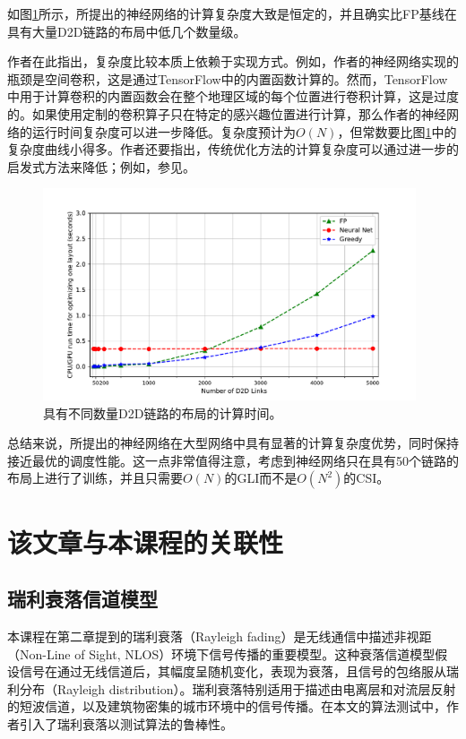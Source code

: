 \documentclass[UTF8, 12pt]{article}
\numberwithin{figure}{section}
\begin{document}
如图\ref{fig:varyDensityTime}所示，所提出的神经网络的计算复杂度大致是恒定的，并且确实比FP基线在具有大量D2D链路的布局中低几个数量级。

作者在此指出，复杂度比较本质上依赖于实现方式。例如，作者的神经网络实现的瓶颈是空间卷积，这是通过TensorFlow中的内置函数计算的\cite{tensorflow}。然而，TensorFlow中用于计算卷积的内置函数会在整个地理区域的每个位置进行卷积计算，这是过度的。如果使用定制的卷积算子只在特定的感兴趣位置进行计算，那么作者的神经网络的运行时间复杂度可以进一步降低。复杂度预计为$O(N)$，但常数要比图\ref{fig:varyDensityTime}中的复杂度曲线小得多。作者还要指出，传统优化方法的计算复杂度可以通过进一步的启发式方法来降低；例如，参见\cite{Guo_1000}。

\begin{figure}
\centering
\includegraphics[width=11cm]{fig/VaryDensityTime}
\caption{具有不同数量D2D链路的布局的计算时间。}
\label{fig:varyDensityTime}
\end{figure}

总结来说，所提出的神经网络在大型网络中具有显著的计算复杂度优势，同时保持接近最优的调度性能。这一点非常值得注意，考虑到神经网络只在具有50个链路的布局上进行了训练，并且只需要$O(N)$的GLI而不是$O(N^2)$的CSI。

\clearpage

\section{该文章与本课程的关联性}

\subsection{瑞利衰落信道模型}


本课程在第二章提到的瑞利衰落（Rayleigh fading）是无线通信中描述非视距（Non-Line of Sight, NLOS）环境下信号传播的重要模型。这种衰落信道模型假设信号在通过无线信道后，其幅度呈随机变化，表现为衰落，且信号的包络服从瑞利分布（Rayleigh distribution）。瑞利衰落特别适用于描述由电离层和对流层反射的短波信道，以及建筑物密集的城市环境中的信号传播。在本文的算法测试中，作者引入了瑞利衰落以测试算法的鲁棒性。
\end{document}
